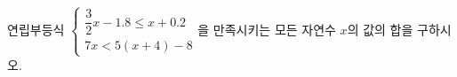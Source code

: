 연립부등식 $\begin{cases} \dfrac{3}{2}x-1.8\le x+0.2 \\ 7x<5(x+4)-8 \end{cases}$을 만족시키는 모든 자연수 $x$의 값의 합을 구하시오.
